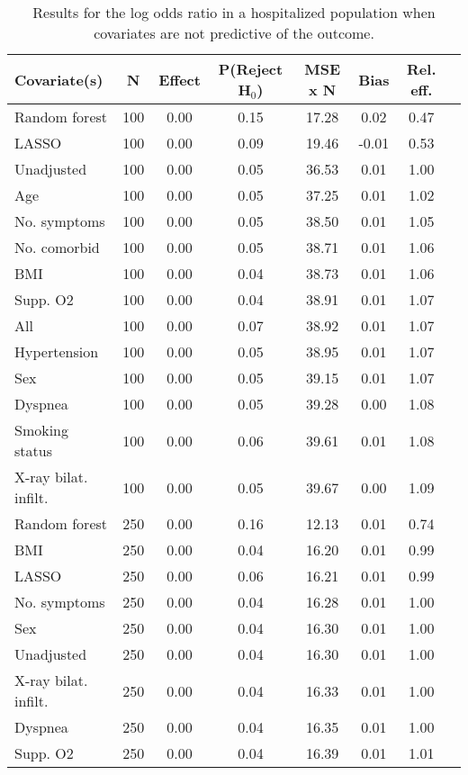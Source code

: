 \documentclass{article}
\begin{document}
{\tabcolsep=6pt  %
\begin{longtable}{lccccccc}
\caption{Results for the log odds ratio in a hospitalized population when covariates are not predictive of the outcome.} \\
Covariate(s) & N & Effect & P(Reject H$_0$) & MSE x N & Bias & Rel. eff.\\ \midrule
Random forest & 100 & 0.00 & 0.15 & 17.28 &  0.02 & 0.47 \\ 
LASSO & 100 & 0.00 & 0.09 & 19.46 & -0.01 & 0.53 \\ 
Unadjusted & 100 & 0.00 & 0.05 & 36.53 &  0.01 & 1.00 \\ 
Age & 100 & 0.00 & 0.05 & 37.25 &  0.01 & 1.02 \\ 
No. symptoms & 100 & 0.00 & 0.05 & 38.50 &  0.01 & 1.05 \\ 
No. comorbid & 100 & 0.00 & 0.05 & 38.71 &  0.01 & 1.06 \\ 
BMI & 100 & 0.00 & 0.04 & 38.73 &  0.01 & 1.06 \\ 
Supp. O2 & 100 & 0.00 & 0.04 & 38.91 &  0.01 & 1.07 \\ 
All & 100 & 0.00 & 0.07 & 38.92 &  0.01 & 1.07 \\ 
Hypertension & 100 & 0.00 & 0.05 & 38.95 &  0.01 & 1.07 \\ 
Sex & 100 & 0.00 & 0.05 & 39.15 &  0.01 & 1.07 \\ 
Dyspnea & 100 & 0.00 & 0.05 & 39.28 &  0.00 & 1.08 \\ 
Smoking status & 100 & 0.00 & 0.06 & 39.61 &  0.01 & 1.08 \\ 
X-ray bilat. infilt. & 100 & 0.00 & 0.05 & 39.67 &  0.00 & 1.09 \\ \midrule() 
Random forest & 250 & 0.00 & 0.16 & 12.13 &  0.01 & 0.74 \\ 
BMI & 250 & 0.00 & 0.04 & 16.20 &  0.01 & 0.99 \\ 
LASSO & 250 & 0.00 & 0.06 & 16.21 &  0.01 & 0.99 \\ 
No. symptoms & 250 & 0.00 & 0.04 & 16.28 &  0.01 & 1.00 \\ 
Sex & 250 & 0.00 & 0.04 & 16.30 &  0.01 & 1.00 \\ 
Unadjusted & 250 & 0.00 & 0.04 & 16.30 &  0.01 & 1.00 \\ 
X-ray bilat. infilt. & 250 & 0.00 & 0.04 & 16.33 &  0.01 & 1.00 \\ 
Dyspnea & 250 & 0.00 & 0.04 & 16.35 &  0.01 & 1.00 \\ 
Supp. O2 & 250 & 0.00 & 0.04 & 16.39 &  0.01 & 1.01 \\ 

\end{longtable}}
\end{document}
